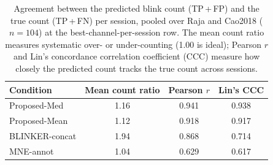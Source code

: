 \begin{table}[ht]
  \centering
  \caption{Agreement between the predicted blink count (TP\,+\,FP) and the true count (TP\,+\,FN) per session, pooled over Raja and Cao2018 ($n=104$) at the best-channel-per-session row. The mean count ratio measures systematic over- or under-counting (1.00 is ideal); Pearson $r$ and Lin's concordance correlation coefficient (CCC) measure how closely the predicted count tracks the true count across sessions.}
  \label{tab:count_agreement}
  \begin{tabular}{lccc}
    \toprule
    Condition & Mean count ratio & Pearson $r$ & Lin's CCC \\
    \midrule
    Proposed-Med & 1.16 & 0.941 & 0.938 \\
    Proposed-Mean & 1.12 & 0.918 & 0.917 \\
    BLINKER-concat & 1.94 & 0.868 & 0.714 \\
    MNE-annot & 1.04 & 0.629 & 0.617 \\
    \bottomrule
  \end{tabular}
\end{table}
